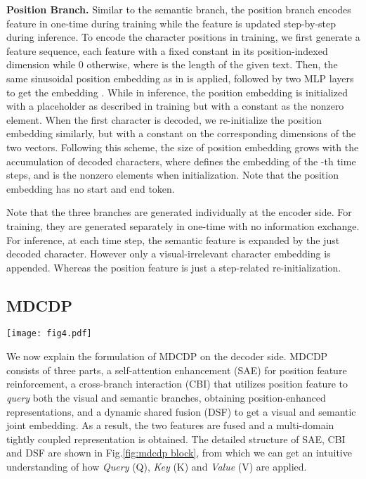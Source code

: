 \noindent\textbf{Position Branch.}
Similar to the semantic branch, the position branch encodes feature in one-time during training while the feature is updated step-by-step during inference. To encode the character positions in training, we first generate a feature sequence, each feature with a fixed constant  in its position-indexed dimension while 0 otherwise, where  is the length of the given text. Then, the same sinusoidal position embedding as in \citep{vaswani2017transformer} is applied, followed by two MLP layers to get the embedding . While in inference, the position embedding is initialized with a placeholder  as described in training but with a constant  as the nonzero element. When the first character is decoded, we re-initialize the position embedding  similarly, but with a constant  on the corresponding dimensions of the two vectors. Following this scheme, the size of position embedding grows with the accumulation of decoded characters, where  defines the embedding of the -th time steps, and  is the nonzero elements when initialization. Note that the position embedding has no start and end token.

Note that the three branches are generated individually at the encoder side. For training, they are generated separately in one-time with no information exchange. For inference, at each time step, the semantic feature is expanded by the just decoded character. However only a visual-irrelevant character embedding is appended. Whereas the position feature is just a step-related re-initialization.


\subsection{MDCDP}
\begin{figure*}[t]
\centering
\texttt{[image: fig4.pdf]} \caption{Details of the MDCDP module. (a) Self-Attention Enhancement (SAE), (b) Cross-Branch Interaction (CBI) and (c) Dynamic Shared Fusion (DSF).}
\label{fig:mdcdp block}
\end{figure*}

We now explain the formulation of MDCDP on the decoder side. MDCDP consists of three parts, a self-attention enhancement (SAE) for position feature reinforcement, a cross-branch interaction (CBI) that utilizes position feature to \emph{query} both the visual and semantic branches, obtaining position-enhanced representations, and a dynamic shared fusion (DSF) to get a visual and semantic joint embedding. As a result, the two features are fused and a multi-domain tightly coupled representation is obtained. The detailed structure of SAE, CBI and DSF are shown in Fig.\ref{fig:mdcdp block}, from which we can get an intuitive understanding of how \emph{Query} (Q), \emph{Key} (K) and \emph{Value} (V) are applied.


